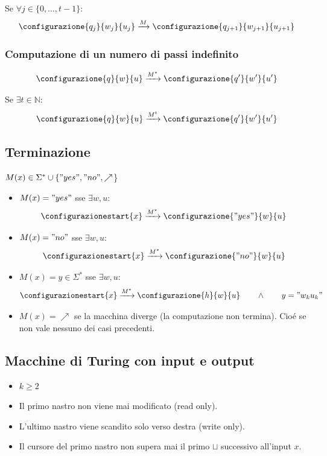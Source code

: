Se $\forall j \in \{0, \dots, t-1\} :$
\[
\configurazione{q_j}{w_j}{u_j}
\xrightarrow{M}
\configurazione{q_{j+1}}{w_{j+1}}{u_{j+1}}
\]

\subsubsection{Computazione di un numero di passi indefinito}
\[
\configurazione{q}{w}{u}
\xrightarrow{M^*}
\configurazione{q'}{w'}{u'}
\]

Se $\exists t \in \mathbb{N} :$
\[
\configurazione{q}{w}{u}
\xrightarrow{M^t}
\configurazione{q'}{w'}{u'}
\]

\subsection{Terminazione}
    $M(x) \in \Sigma^* \cup \{"yes", "no",\nearrow$\}
    \begin{itemize}
        \item $M(x) = "yes"$ sse $\exists w, u :$
        \[
        \configurazionestart{x} \xrightarrow{M^*} \configurazione{"yes"}{w}{u}
        \]
        \item $M(x) = "no"$ sse $\exists w, u :$
        \[
        \configurazionestart{x} \xrightarrow{M^*} \configurazione{"no"}{w}{u}
        \]
        \item $M(x) = y \in \Sigma^*$ sse $\exists w, u :$
        \[
        \configurazionestart{x} \xrightarrow{M^*} \configurazione{h}{w}{u} \qquad \land \qquad 
        y = "w_k u_k"
        \]
        \item $M(x) = \nearrow$ se la macchina diverge (la computazione non termina). Cioé se non vale nessuno dei casi precedenti.
	\end{itemize}

\subsection{Macchine di Turing con input e output}
\begin{itemize}
	\item $k \geq 2$
	\item Il primo nastro non viene mai modificato (read only).
	\item L'ultimo nastro viene scandito solo verso destra (write only).
	\item Il cursore del primo nastro non supera mai il primo $\sqcup$ successivo all'input $x$.
\end{itemize}

